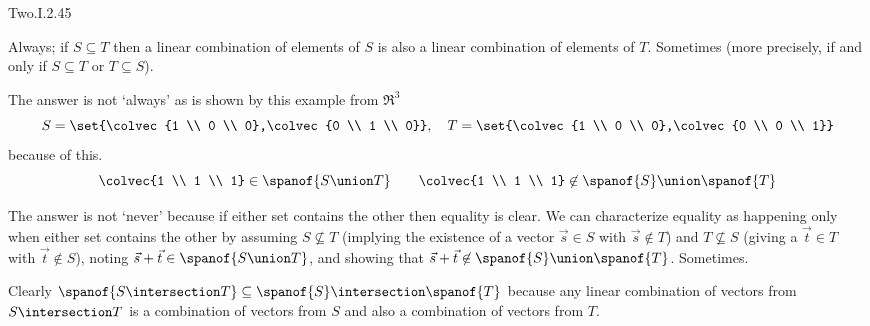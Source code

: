 \begin{ans}{Two.I.2.45}
      \begin{exparts}
         \partsitem Always;
           if \( S\subseteq T \) then a linear combination of elements of
           \( S \) is also a linear combination of elements of \( T \).
         \partsitem Sometimes (more precisely, if and only if
           \( S\subseteq T \) or \( T\subseteq S \)).

           The answer is not `always' as is shown by this example from
           \( \Re^3 \)
           \begin{equation*}
             S=\set{\colvec{1 \\ 0 \\ 0},\colvec{0 \\ 1 \\ 0}},\quad
             T=\set{\colvec{1 \\ 0 \\ 0},\colvec{0 \\ 0 \\ 1}}
           \end{equation*}
           because of this.
           \begin{equation*}
             \colvec{1 \\ 1 \\ 1}\in\spanof{S\union T}
             \qquad
             \colvec{1 \\ 1 \\ 1}\not\in\spanof{S}\union \spanof{T}
           \end{equation*}

           The answer is not `never' because if either set contains the other
           then equality is clear.
           We can
           characterize equality as happening only when either set contains
           the other by assuming \( S\not\subseteq T \) (implying the
           existence of a vector \( \vec{s}\in S \) with
           \( \vec{s}\not\in T \))
           and \( T\not\subseteq S \) (giving a \( \vec{t}\in T \) with
           \( \vec{t}\not\in S \)), noting
           \( \vec{s}+\vec{t}\in\spanof{S\union T} \),
           and showing that
           \( \vec{s}+\vec{t}\not\in\spanof{S}\union\spanof{T} \).
         \partsitem Sometimes.

           Clearly
           \( \spanof{S\intersection T}
             \subseteq\spanof{S}\intersection\spanof{T} \)
           because any linear combination of vectors from
           \( S\intersection T \)
           is a combination of vectors from \( S \) and also a combination of
           vectors from \( T \).


\end{exparts}
\end{ans}
